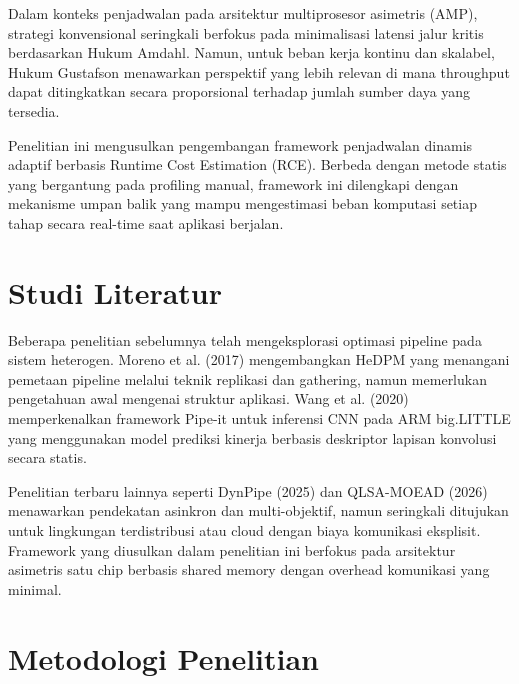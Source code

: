 \documentclass[conference]{IEEEtran}
\begin{document}
Dalam konteks penjadwalan pada arsitektur multiprosesor asimetris (AMP), strategi konvensional seringkali berfokus pada minimalisasi latensi jalur kritis berdasarkan Hukum Amdahl. Namun, untuk beban kerja kontinu dan skalabel, Hukum Gustafson menawarkan perspektif yang lebih relevan di mana throughput dapat ditingkatkan secara proporsional terhadap jumlah sumber daya yang tersedia.

Penelitian ini mengusulkan pengembangan framework penjadwalan dinamis adaptif berbasis Runtime Cost Estimation (RCE). Berbeda dengan metode statis yang bergantung pada profiling manual, framework ini dilengkapi dengan mekanisme umpan balik yang mampu mengestimasi beban komputasi setiap tahap secara real-time saat aplikasi berjalan.

\section{Studi Literatur}
Beberapa penelitian sebelumnya telah mengeksplorasi optimasi pipeline pada sistem heterogen. Moreno et al. (2017) mengembangkan HeDPM yang menangani pemetaan pipeline melalui teknik replikasi dan gathering, namun memerlukan pengetahuan awal mengenai struktur aplikasi. Wang et al. (2020) memperkenalkan framework Pipe-it untuk inferensi CNN pada ARM big.LITTLE yang menggunakan model prediksi kinerja berbasis deskriptor lapisan konvolusi secara statis.

Penelitian terbaru lainnya seperti DynPipe (2025) dan QLSA-MOEAD (2026) menawarkan pendekatan asinkron dan multi-objektif, namun seringkali ditujukan untuk lingkungan terdistribusi atau cloud dengan biaya komunikasi eksplisit. Framework yang diusulkan dalam penelitian ini berfokus pada arsitektur asimetris satu chip berbasis shared memory dengan overhead komunikasi yang minimal.

\section{Metodologi Penelitian}
\end{document}
